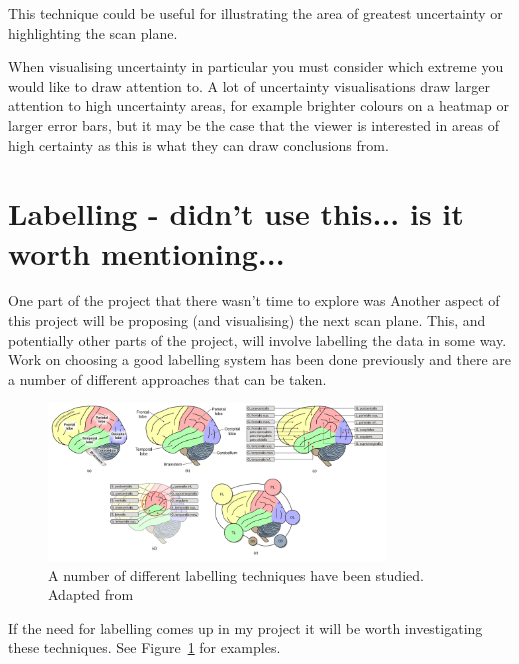 This technique could be useful for illustrating the area of greatest uncertainty or highlighting the scan plane.

When visualising uncertainty in particular you must consider which extreme you would like to draw attention to. A lot of uncertainty visualisations draw larger attention to high uncertainty areas, for example brighter colours on a heatmap or larger error bars, but it may be the case that the viewer is interested in areas of high certainty as this is what they can draw conclusions from.

\newpage
\section{Labelling - didn't use this... is it worth mentioning...}
One part of the project that there wasn't time to explore was Another aspect of this project will be proposing (and visualising) the next scan plane. This, and potentially other parts of the project, will involve labelling the data in some way. Work on choosing a good labelling system has been done previously and there are a number of different approaches that can be taken\cite{labelling}.

\begin{figure}[h]
    \centering
	\includegraphics[width=0.8\textwidth]{images/labels.png}
    \caption{A number of different labelling techniques have been studied. Adapted from \cite{labelling}}
    \label{fig:labels}
\end{figure}

If the need for labelling comes up in my project it will be worth investigating these techniques. See Figure~\ref{fig:labels} for examples.